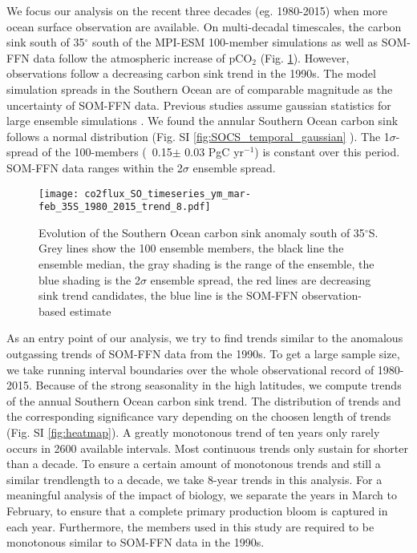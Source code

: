 \documentclass[12pt]{article}
\begin{document}
We focus our analysis on the recent three decades (eg. 1980-2015) when more ocean surface observation are available. On multi-decadal timescales, the carbon sink south of 35$^\circ$ south of the MPI-ESM 100-member simulations as well as SOM-FFN data follow the atmospheric increase of pCO$_2$ (Fig. \ref{fig:evolution_southern_ocean_carbon_sink}). However, observations follow a decreasing carbon sink trend in the 1990s. The model simulation spreads in the Southern Ocean are of comparable magnitude as the uncertainty of SOM-FFN data. Previous studies assume gaussian statistics for large ensemble simulations \citep{Thompson2015}. We found the annular Southern Ocean carbon sink follows a normal distribution (Fig. SI \ref{fig:SOCS_temporal_gaussian} ). The 1$\sigma$-spread of the 100-members (~0.15$\pm$ 0.03 PgC yr$^{-1}$) is constant over this period. SOM-FFN data ranges within the 2$\sigma$ ensemble spread. 

\begin{figure}
\texttt{[image: co2flux\_SO\_timeseries\_ym\_mar-feb\_35S\_1980\_2015\_trend\_8.pdf]}
\caption{Evolution of the Southern Ocean carbon sink anomaly south of 35$^\circ$S. Grey lines show the 100 ensemble members, the black line the ensemble median, the gray shading is the range of the ensemble, the blue shading is the 2$\sigma$ ensemble spread, the red lines are decreasing sink trend candidates, the blue line is the SOM-FFN observation-based estimate}
\label{fig:evolution_southern_ocean_carbon_sink}
\end{figure}

As an entry point of our analysis, we try to find trends similar to the anomalous outgassing trends of SOM-FFN data from the 1990s. To get a large sample size, we take running interval boundaries over the whole observational record of 1980-2015. Because of the strong seasonality in the high latitudes, we compute trends of the annual Southern Ocean carbon sink trend. The distribution of trends and the corresponding significance vary depending on the choosen length of trends (Fig. SI \ref{fig:heatmap}). A greatly monotonous trend of ten years only rarely occurs in 2600 available intervals. Most continuous trends only sustain for shorter than a decade. To ensure a certain amount of monotonous trends and still a similar trendlength to a decade, we take 8-year trends in this analysis. For a meaningful analysis of the impact of biology, we separate the years in March to February, to ensure that a complete primary production bloom is captured in each year. Furthermore, the members used in this study are required to be monotonous similar to SOM-FFN data in the 1990s.
 
\end{document}
